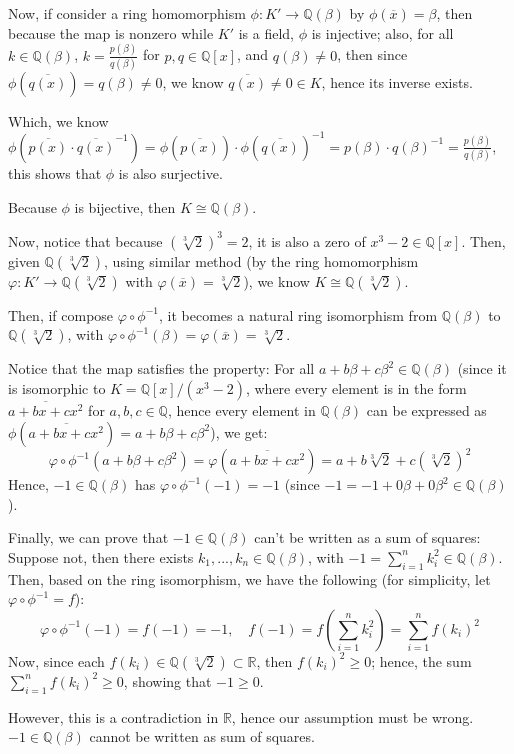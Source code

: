 \documentclass{article}
\begin{document}
Now, if consider a ring homomorphism $\phi:K'\rightarrow\mathbb{Q}(\beta)$ by $\phi(\overline{x})=\beta$, then because the map is nonzero while $K'$ is a field, $\phi$ is injective;
also, for all $k\in\mathbb{Q}(\beta)$, $k=\frac{p(\beta)}{q(\beta)}$ for $p,q\in\mathbb{Q}[x]$, and $q(\beta)\neq 0$,
then since $\phi(\overline{q(x)})=q(\beta)\neq 0$, we know $\overline{q(x)}\neq 0\in K$, hence its inverse exists.

Which, we know $\phi(\overline{p(x)}\cdot \overline{q(x)}^{-1})=\phi(\overline{p(x)})\cdot \phi(\overline{q(x)})^{-1} = p(\beta)\cdot q(\beta)^{-1}=\frac{p(\beta)}{q(\beta)}$, this shows that $\phi$ is also surjective.

Because $\phi$ is bijective, then $K\cong \mathbb{Q}(\beta)$.

\hfil

Now, notice that because $(\sqrt[3]{2})^3 = 2$, it is also a zero of $x^3-2\in\mathbb{Q}[x]$. Then, given $\mathbb{Q}(\sqrt[3]{2})$,
using similar method (by the ring homomorphism $\varphi:K'\rightarrow \mathbb{Q}(\sqrt[3]{2})$ with $\varphi(\overline{x})=\sqrt[3]{2}$), we know $K\cong \mathbb{Q}(\sqrt[3]{2})$.

Then, if compose $\varphi\circ \phi^{-1}$, it becomes a natural ring isomorphism from $\mathbb{Q}(\beta)$ to $\mathbb{Q}(\sqrt[3]{2})$, with $\varphi\circ \phi^{-1}(\beta)=\varphi(\overline{x})=\sqrt[3]{2}$.

Notice that the map satisfies the property: For all $a+b\beta+c\beta^2\in \mathbb{Q}(\beta)$ (since it is isomorphic to $K=\mathbb{Q}[x]/(x^3-2)$, where every element is in the form $\overline{a+bx+cx^2}$ for $a,b,c\in\mathbb{Q}$, 
hence every element in $\mathbb{Q}(\beta)$ can be expressed as $\phi(\overline{a+bx+cx^2})=a+b\beta+c\beta^2$),
we get: 
$$\varphi\circ\phi^{-1}(a+b\beta+c\beta^2)=\varphi(\overline{a+bx+cx^2}) = a+b\sqrt[3]{2}+c(\sqrt[3]{2})^2$$
Hence, $-1\in\mathbb{Q}(\beta)$ has $\varphi\circ\phi^{-1}(-1)=-1$ (since $-1=-1+0\beta+0\beta^2\in\mathbb{Q}(\beta)$).

\hfil

Finally, we can prove that $-1\in\mathbb{Q}(\beta)$ can't be written as a sum of squares: Suppose not, then there exists $k_1,...,k_n\in\mathbb{Q}(\beta)$,
with $-1 = \sum_{i=1}^{n}k_i^2\in\mathbb{Q}(\beta)$. Then, based on the ring isomorphism, we have the following (for simplicity, let $\varphi\circ\phi^{-1}=f$):
$$\varphi\circ\phi^{-1}(-1)=f(-1)=-1,\quad f(-1)=f\left(\sum_{i=1}^{n}k_i^2\right)=\sum_{i=1}^{n}f(k_i)^2$$
Now, since each $f(k_i)\in \mathbb{Q}(\sqrt[3]{2})\subset\mathbb{R}$, then $f(k_i)^2\geq 0$; hence, the sum $\sum_{i=1}^{n}f(k_i)^2\geq 0$, showing that $-1 \geq 0$.

However, this is a contradiction in $\mathbb{R}$, hence our assumption must be wrong. $-1\in\mathbb{Q}(\beta)$ cannot be written as sum of squares.
\end{document}
